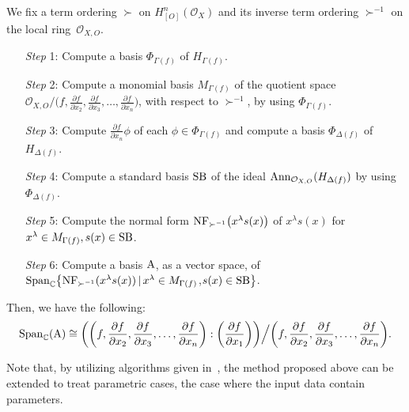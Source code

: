 \documentclass[pdftex]{sigma}%
\numberwithin{equation}{section}
\begin{document}
We fix a term ordering $\succ$ on $H_{[O]}^n({\mathcal O}_X)$ and its inverse term ordering $\succ^{-1}$
on the local ring~${\mathcal O}_{X,O}$.
\begin{enumerate}\itemsep=0pt
\setlength{\leftskip}{0.45cm}

\item[{\it Step} 1:] Compute a basis $\Phi_{\Gamma(f)} $ of $ H_{\Gamma(f)}$.

\item[{\it Step} 2:] Compute a monomial basis $M_{\Gamma(f)}$ of the quotient space ${\mathcal O}_{X,O}/
\big(f, \frac{\partial f}{\partial x_2}, \frac{\partial f}{\partial x_3},\ldots,
\frac{\partial f}{\partial x_{n}}\big)$, with respect to $\succ^{-1}$, by using $\Phi_{\Gamma(f)}$.

\item[{\it Step} 3:] Compute $\frac{\partial f}{\partial x_n}\phi$ of each $\phi \in \Phi_{\Gamma(f)}$ and compute a basis $\Phi_{\Delta(f)}$ of $H_{\Delta(f)}$.

\item[{\it Step} 4:] Compute a standard basis ${\rm SB}$ of the ideal ${\rm Ann}_{{\mathcal O}_{X, O}}(H_{\Delta(f)})$ by using $\Phi_{\Delta(f)}$.

\item[{\it Step} 5:] Compute the normal form ${\rm NF}_{\succ^{-1}}\big(x^{\lambda} s(x)\big)$ of $x^{\lambda}s(x)$ for $x^{\lambda} \in M_{\Gamma(f)}, s(x) \in {\rm SB}$.

\item[{\it Step} 6:] Compute a basis $ {\rm A} $, as a vector space, of
${\rm Span}_{{\mathbb C}}\big\{ {\rm NF}_{\succ^{-1}}(x^{\lambda} s(x)) \,|\, x^{\lambda} \in M_{\Gamma(f)}$,\linebreak \mbox{$s(x) \in {\rm SB} \big\}$}.
\end{enumerate}
Then, we have the following:
\begin{gather*}
{\rm Span}_{{\mathbb C}}({\rm A}) \cong \bigg(\bigg(f, \frac{\partial f}{\partial x_2}, \frac{\partial f}{\partial x_3},\ldots,
\frac{\partial f}{\partial x_{n}}\bigg) : \bigg(\frac{\partial f}{\partial x_1}\bigg)\bigg)\Big/\bigg(f, \frac{\partial f}{\partial x_2}, \frac{\partial f}{\partial x_3},\ldots,
\frac{\partial f}{\partial x_{n}}\bigg).
\end{gather*}


Note that, by utilizing algorithms given in~\cite{NT17a}, the method proposed above can be extended to treat parametric cases,
the case where the input data contain parameters.
\end{document}
